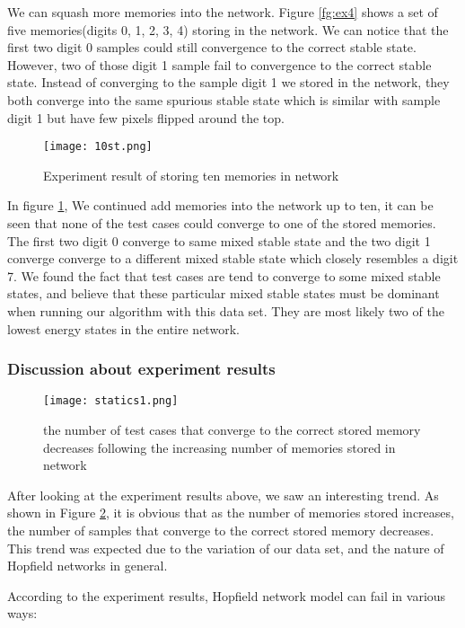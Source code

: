 We can squash more memories into the network. Figure \ref{fg:ex4} shows a set of five memories(digits 0, 1, 2, 3, 4) storing in the network. We can notice that the first two digit 0 samples could still convergence to the correct stable state. However, two of those digit 1 sample fail to convergence to the correct stable state. Instead of converging to the sample digit 1 we stored in the network, they both converge into the same spurious stable state which is similar with sample digit 1 but have few pixels flipped around the top.\\

\begin{figure}[h]
\centering
\texttt{[image: 10st.png]}
\caption{Experiment result of storing ten memories in network}
\label{fg:ex5}
\end{figure}

In figure \ref{fg:ex5}, We continued add memories into the network up to ten, it can be seen that none of the test cases could converge to one of the stored memories. The first two digit 0 converge to same mixed stable state and the two digit 1 converge converge to a different mixed stable state which closely resembles a digit 7. We found the fact that test cases are tend to converge to some mixed stable states, and believe that these particular mixed stable states must be dominant when running our algorithm with this data set. They are most likely two of the lowest energy states in the entire network.\newpage

\subsubsection{Discussion about experiment results}
\begin{figure}[h]
\centering
\texttt{[image: statics1.png]}
\caption{the number of test cases that converge to the correct stored memory decreases following the increasing number of memories stored in network}
\label{fg:ex6}
\end{figure}
After looking at the experiment results above, we saw an interesting trend. As shown in Figure \ref{fg:ex6}, it is obvious that as the number of memories stored increases, the number of samples that converge to the correct stored memory decreases. This trend was expected due to the variation of our data set, and the nature of Hopfield networks in general. \newpage

According to the experiment results, Hopfield network model can fail in various ways:\\

